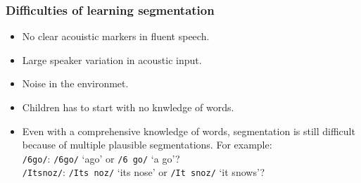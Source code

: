 \begin{frame}
\frametitle{Difficulties of learning segmentation}

\begin{itemize}
\item No clear acouistic markers in fluent speech.
\item Large speaker variation in acoustic input.
\item Noise in the environmet.
\item Children has to start with no knwledge of words.
\item Even with a comprehensive knowledge of words, segmentation is
      still difficult because of multiple plausible segmentations. For
      example:\\
      \texttt{/6go/}:  \texttt{/6go/} `ago' or \texttt{/6 go/} `a go'?\\
      \texttt{/Itsnoz/}: \texttt{/Its noz/} ‘its nose’ or \texttt{/It snoz/} ‘it snows’?
\end{itemize}

\end{frame}
